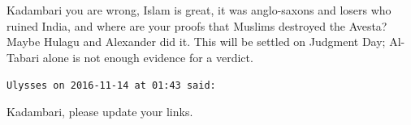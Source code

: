 \begin{footnotesize}
\begin{sffamily}
Kadambari you are wrong, Islam is great, it was anglo-saxons and losers who ruined India, and where are your proofs that Muslims destroyed the Avesta? Maybe Hulagu and Alexander did it. This will be settled on Judgment Day; Al-Tabari alone is not enough evidence for a verdict.

\hfill

\texttt{Ulysses on 2016-11-14 at 01:43 said:}

Kadambari, please update your links.


\hfill

\end{sffamily}
\end{footnotesize}

